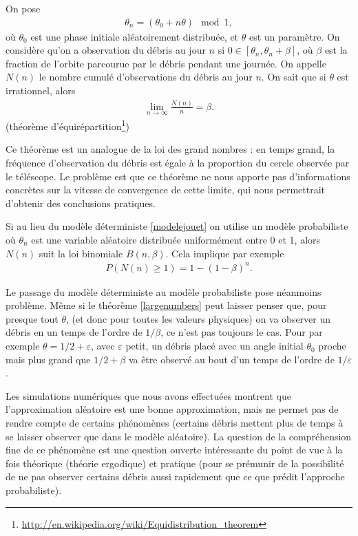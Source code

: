 \documentclass[11pt,a4paper,reqno]{amsart}
\newcommand{\eps}{\varepsilon}
\begin{document}
On pose
\begin{align}
  \label{modelejouet}
  \theta_{n} = (\theta_{0} + n \theta) \mod 1,
\end{align}
où $\theta_{0}$ est une phase initiale aléatoirement distribuée, et
$\theta$ est un paramètre. On considère qu'on a observation du débris
au jour $n$ si $0 \in [\theta_{n}, \theta_{n}+\beta]$, où $\beta$ est
la fraction de l'orbite parcourue par le débris pendant une
journée. On appelle $N(n)$ le nombre cumulé d'observations du débris
au jour $n$. On sait que si $\theta$ est irrationnel, alors
\begin{align}
  \label{largenumbers}
  \lim_{n\to\infty} \frac{N(n)} n = \beta.
\end{align}
(théorème d'équirépartition\footnote{\url{http://en.wikipedia.org/wiki/Equidistribution_theorem}})

Ce théorème est un analogue de la loi des grand nombres : en temps
grand, la fréquence d'observation du débris est égale à la proportion
du cercle observée par le téléscope. Le problème est que ce théorème
ne nous apporte pas d'informations concrètes sur la vitesse de
convergence de cette limite, qui nous permettrait d'obtenir des
conclusions pratiques. 

Si au lieu du modèle déterministe \eqref{modelejouet} on utilise un
modèle probabiliste où $\theta_{n}$ est une variable aléatoire
distribuée uniformément entre 0 et 1, alors $N(n)$ suit la loi
binomiale $B(n,\beta)$. Cela implique par exemple
\begin{align}
  P(N(n) \geq 1) = 1 - (1-\beta)^{n}.
\end{align}

Le passage du modèle déterministe au modèle probabiliste pose
néanmoins problème. Même si le théorème \eqref{largenumbers} peut
laisser penser que, pour presque tout $\theta$, (et donc pour toutes
les valeurs physiques) on va observer un débris en un temps de l'ordre
de $1/\beta$, ce n'est pas toujours le cas. Pour par exemple $\theta =
1/2 + \eps$, avec $\eps$ petit, un débris placé avec un angle initial
$\theta_{0}$ proche mais plus grand que $1/2 + \beta$ va être observé
au bout d'un temps de l'ordre de $1/\eps$.

Les simulations numériques que nous avons effectuées montrent que
l'approximation aléatoire est une bonne approximation, mais ne permet
pas de rendre compte de certains phénomènes (certains débris mettent
plus de temps à se laisser observer que dans le modèle aléatoire). La
question de la compréhension fine de ce phénomène est une question
ouverte intéressante du point de vue à la fois théorique (théorie
ergodique) et pratique (pour se prémunir de la possibilité de ne pas
observer certains débris aussi rapidement que ce que prédit l'approche
probabiliste).
\end{document}
